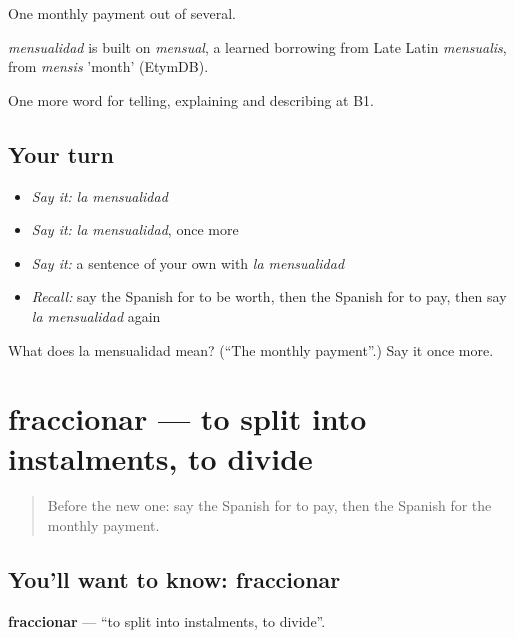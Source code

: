 One monthly payment out of several.

\begin{cousinweb}
\emph{mensualidad} is built on \emph{mensual}, a learned borrowing from Late Latin \emph{mensualis}, from \emph{mensis} 'month' (EtymDB).
\end{cousinweb}

\begin{grammarlens}[title={What you've built}]
One more word for telling, explaining and describing at B1.
\end{grammarlens}

\subsection*{Your turn}
\begin{itemize}
\raggedright
  \item \emph{Say it:} \emph{la mensualidad}
  \item \emph{Say it:} \emph{la mensualidad}, once more
  \item \emph{Say it:} a sentence of your own with \emph{la mensualidad}
  \item \emph{Recall:} say the Spanish for to be worth, then the Spanish for to pay, then say \emph{la mensualidad} again
\end{itemize}

\begin{tcolorbox}[breakable,colback=teal!4,colframe=teal!35!black,title={Before you move on}]
What does la mensualidad mean? (\textquotedblleft{}The monthly payment\textquotedblright{}.) Say it once more.
\end{tcolorbox}
\section[fraccionar]{fraccionar — to split into instalments, to divide}

\label{lesson:ES-C632-fraccionar}



\begin{quote}
Before the new one: say the Spanish for to pay, then the Spanish for the monthly payment.
\end{quote}

\subsection*{You'll want to know: fraccionar}
\textbf{fraccionar} — \textquotedblleft{}to split into instalments, to divide\textquotedblright{}.

